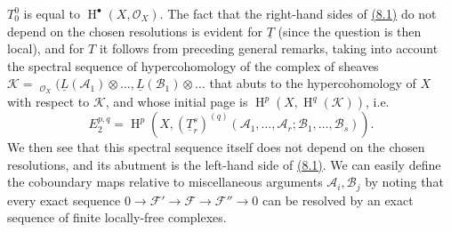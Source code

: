 \documentclass{article}
\newcommand{\scr}[1]{{\mathscr{#1}}}
\DeclareMathOperator{\shHom}{\underline{Hom}}
\DeclareMathOperator{\HH}{H}
\begin{document}
$T_0^0$ is equal to $\HH^\bullet(X,\scr{O}_X)$.
The fact that the right-hand sides of \hyperref[8.1]{(8.1)} do not depend on the chosen resolutions is evident for $\underline{T}$ (since the question is then local), and for $T$ it follows from preceding general remarks, taking into account the spectral sequence of hypercohomology of the complex of sheaves $\scr{K}=\shHom_{\scr{O}_X}(\underline{L}(\scr{A}_1)\otimes\ldots,\underline{L}(\scr{B}_1)\otimes\ldots$ that abuts to the hypercohomology of $X$ with respect to $\scr{K}$, and whose initial page is $\HH^p(X,\HH^q(\scr{K}))$, i.e.
\[
\label{8.2}
  E_2^{p,q} = \HH^p(X,(\underline{T}_r^s)^{(q)}(\scr{A}_1,\ldots,\scr{A}_r;\scr{B}_1,\ldots,\scr{B}_s)).
\tag{8.2}
\]
We then see that this spectral sequence itself does not depend on the chosen resolutions, and its abutment is the left-hand side of \hyperref[8.1]{(8.1)}.
We can easily define the coboundary maps relative to miscellaneous arguments $\scr{A}_i,\scr{B}_j$ by noting that every exact sequence $0\to\scr{F}'\to\scr{F}\to\scr{F}''\to0$ can be resolved by an exact sequence of finite locally-free complexes.
\end{document}
